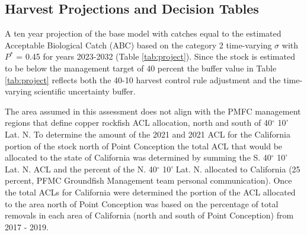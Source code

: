 \documentclass[11pt,
  english,
  a4paper,
]{article}
\begin{document}
\leavevmode\tagmcend\tagstructend\par


\hypertarget{harvest-projections-and-decision-tables}{%
\subsection{Harvest Projections and Decision Tables}\label{harvest-projections-and-decision-tables}}

\leavevmode\tagmcend\tagstructend


A ten year projection of the base model with catches equal to the estimated Acceptable Biological Catch (ABC) based on the category 2 time-varying {\(\sigma\)\leavevmode\tagmcend\tagstructend} with {\(P^*\)\leavevmode\tagmcend\tagstructend} = 0.45 for years 2023-2032 (Table \ref{tab:project}). Since the stock is estimated to be below the management target of 40 percent the buffer value in Table \ref{tab:project} reflects both the 40-10 harvest control rule adjustment and the time-varying scientific uncertainty buffer.

\leavevmode\tagmcend\tagstructend\par


The area assumed in this assessment does not align with the PMFC management regions that define copper rockfish ACL allocation, north and south of 40{\(^\circ\)\leavevmode\tagmcend\tagstructend} 10' Lat. N. To determine the amount of the 2021 and 2021 ACL for the California portion of the stock north of Point Conception the total ACL that would be allocated to the state of California was determined by summing the S. 40{\(^\circ\)\leavevmode\tagmcend\tagstructend} 10' Lat. N. ACL and the percent of the N. 40{\(^\circ\)\leavevmode\tagmcend\tagstructend} 10' Lat. N. allocated to California (25 percent, PFMC Groundfish Management team personal communication). Once the total ACLs for California were determined the portion of the ACL allocated to the area north of Point Conception was based on the percentage of total removals in each area of California (north and south of Point Conception) from 2017 - 2019.
\end{document}
